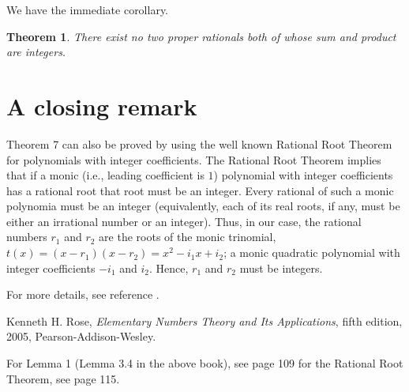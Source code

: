 \documentclass[12pt]{article}
\newtheorem{theorem}{Theorem}
\begin{document}
We have the immediate corollary.

\begin{theorem}  There exist no two proper rationals both of whose sum and
  product are integers.\end{theorem}

\section{A closing remark}

Theorem 7 can also be proved by using the well known Rational Root Theorem for
polynomials with integer coefficients.  The Rational Root Theorem implies that
if a monic (i.e., leading coefficient is $1$) polynomial with integer
coefficients has a rational root that root must be an integer.   Every
rational of such a monic polynomia must be an integer  (equivalently, each of
its real roots, if any, must be either an irrational number or an integer).
Thus, in our case, the rational numbers $r_1$ and $r_2$ are the roots of the
monic trinomial, $t(x)= (x-r_1)(x-r_2) = x^2 - i_1x + i_2$; a monic quadratic
polynomial with integer coefficients $-i_1$ and $i_2$.  Hence, $r_1$ and $r_2$
must be integers.

For more details, see reference \cite{1}.

\begin{thebibliography}{99}
 Kenneth H. Rose, {\it Elementary Numbers Theory and Its
  Applications}, fifth edition, 2005, Pearson-Addison-Wesley.

For Lemma 1 (Lemma 3.4 in the above book), see page 109 for the Rational Root
Theorem, see page 115.
\end{thebibliography}
\end{document}
